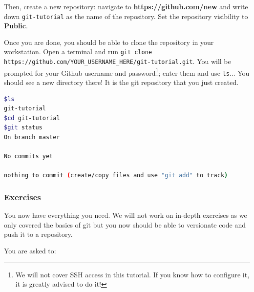 \documentclass[12pt]{article}
\let\oldhref\href
\renewcommand{\href}[2]{\oldhref{#1}{\bfseries#2}}
\begin{document}
Then, create a new repository: navigate to \href{https://github.com/new}{https://github.com/new} and write down \texttt{git-tutorial} as the name of the repository. Set the repository visibility to \textbf{Public}.

Once you are done, you should be able to clone the repository in your workstation. Open a terminal and run \texttt{git clone https://github.com/YOUR\_USERNAME\_HERE/git-tutorial.git}. You will be prompted for your Github username and password\footnote{We will not cover SSH access in this tutorial. If you know how to configure it, it is greatly advised to do it!}; enter them and use \texttt{ls}... You should see a new directory there! It is the git repository that you just created.

%

\begin{lstlisting}[language=bash]
$ls
git-tutorial
$cd git-tutorial
$git status
On branch master

No commits yet

nothing to commit (create/copy files and use "git add" to track)
\end{lstlisting}


\subsubsection{Exercises}

You now have everything you need. We will not work on in-depth exercises as we only covered the basics of git but you now should be able to versionate code and push it to a repository.

You are asked to:
\end{document}
